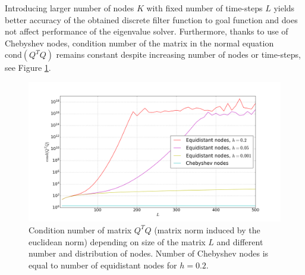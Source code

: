 \documentclass[a4paper,11pt,bibliography=totoc,listof=totoc,headinclude=true,cleardoublepage=empty,oneside]{scrbook}
\begin{document}
Introducing larger number of nodes $K$ with fixed number of time-steps $L$ yields better accuracy of the obtained discrete filter function to goal function and does not affect performance of the eigenvalue solver. Furthermore, thanks to use of Chebyshev nodes, condition number of the matrix in the normal equation $\mathrm{cond}(Q^TQ)$ remains constant despite increasing number of nodes or time-steps, see Figure \ref{fig:least sq cond}.

\begin{figure}[h]
    \centering
    \includegraphics[width=1\linewidth]{latex//images//cheb_least_sq/Figure_3.png}
    \caption{Condition number of matrix $Q^TQ$ (matrix norm induced by the euclidean norm) depending on size of the matrix $L$ and different number and distribution of nodes. Number of Chebyshev nodes is equal to number of equidistant nodes for $h=0.2$. }
    \label{fig:least sq cond}
\end{figure}
\end{document}
